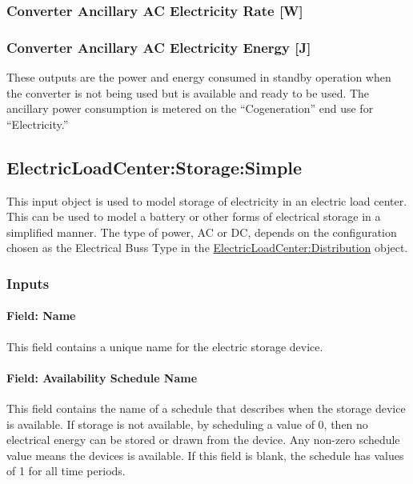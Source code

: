 \subsubsection{Converter Ancillary AC Electricity Rate {[}W{]}}\label{converter-ancillary-ac-electric-power-w}

\subsubsection{Converter Ancillary AC Electricity Energy {[}J{]}}\label{converter-ancillary-ac-electric-energy-j}

These outputs are the power and energy consumed in standby operation when the converter is not being used but is available and ready to be used. The ancillary power consumption is metered on the ``Cogeneration'' end use for ``Electricity.''

\subsection{ElectricLoadCenter:Storage:Simple}\label{electricloadcenterstoragesimple}

This input object is used to model storage of electricity in an electric load center. This can be used to model a battery or other forms of electrical storage in a simplified manner. The type of power, AC or DC, depends on the configuration chosen as the Electrical Buss Type in the \hyperref[electricloadcenterdistribution]{ElectricLoadCenter:Distribution} object.

\subsubsection{Inputs}\label{inputs-6-007}

\paragraph{Field: Name}\label{field-name-6-005}

This field contains a unique name for the electric storage device.

\paragraph{Field: Availability Schedule Name}\label{field-availability-schedule-name-5-000}

This field contains the name of a schedule that describes when the storage device is available. If storage is not available, by scheduling a value of 0, then no electrical energy can be stored or drawn from the device. Any non-zero schedule value means the devices is available. If this field is blank, the schedule has values of 1 for all time periods.

